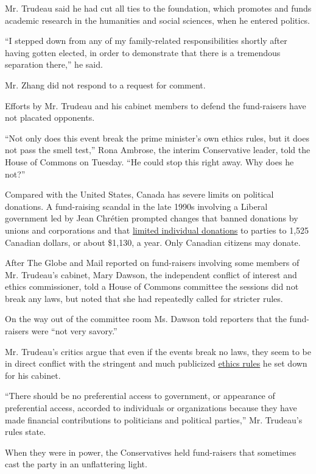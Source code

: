 Mr. Trudeau said he had cut all ties to the foundation, which promotes
and funds academic research in the humanities and social sciences, when
he entered politics.

``I stepped down from any of my family-related responsibilities shortly
after having gotten elected, in order to demonstrate that there is a
tremendous separation there,'' he said.

Mr. Zhang did not respond to a request for comment.

Efforts by Mr. Trudeau and his cabinet members to defend the
fund-raisers have not placated opponents.

``Not only does this event break the prime minister's own ethics rules,
but it does not pass the smell test,'' Rona Ambrose, the interim
Conservative leader, told the House of Commons on Tuesday. ``He could
stop this right away. Why does he not?''

Compared with the United States, Canada has severe limits on political
donations. A fund-raising scandal in the late 1990s involving a Liberal
government led by Jean Chrétien prompted changes that banned donations
by unions and corporations and that
\href{http://www.elections.ca/content.aspx?section=pol\&document=index\&dir=lim\&lang=e}{limited
individual donations} to parties to 1,525 Canadian dollars, or about
\$1,130, a year. Only Canadian citizens may donate.

After The Globe and Mail reported on fund-raisers involving some members
of Mr. Trudeau's cabinet, Mary Dawson, the independent conflict of
interest and ethics commissioner, told a House of Commons committee the
sessions did not break any laws, but noted that she had repeatedly
called for stricter rules.

On the way out of the committee room Ms. Dawson told reporters that the
fund-raisers were ``not very savory.''

Mr. Trudeau's critics argue that even if the events break no laws, they
seem to be in direct conflict with the stringent and much publicized
\href{http://pm.gc.ca/eng/news/2015/11/27/open-and-accountable-government\#Standards_of_Conduct}{ethics
rules} he set down for his cabinet.

``There should be no preferential access to government, or appearance of
preferential access, accorded to individuals or organizations because
they have made financial contributions to politicians and political
parties,'' Mr. Trudeau's rules state.

When they were in power, the Conservatives held fund-raisers that
sometimes cast the party in an unflattering light.

